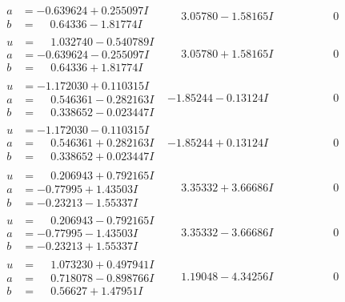 \documentclass[1p]{elsarticle_modified}
\theoremstyle{definition}
\begin{document}
$$\begin{array}{c|c|c}
\begin{aligned}
a &= -0.639624 + 0.255097 I \\
b &= \phantom{-}0.64336 - 1.81774 I\end{aligned}
 & \phantom{-}3.05780 - 1.58165 I & \phantom{-0.000000 } 0 \\ \hline\begin{aligned}
u &= \phantom{-}1.032740 - 0.540789 I \\
a &= -0.639624 - 0.255097 I \\
b &= \phantom{-}0.64336 + 1.81774 I\end{aligned}
 & \phantom{-}3.05780 + 1.58165 I & \phantom{-0.000000 } 0 \\ \hline\begin{aligned}
u &= -1.172030 + 0.110315 I \\
a &= \phantom{-}0.546361 - 0.282163 I \\
b &= \phantom{-}0.338652 - 0.023447 I\end{aligned}
 & -1.85244 - 0.13124 I & \phantom{-0.000000 } 0 \\ \hline\begin{aligned}
u &= -1.172030 - 0.110315 I \\
a &= \phantom{-}0.546361 + 0.282163 I \\
b &= \phantom{-}0.338652 + 0.023447 I\end{aligned}
 & -1.85244 + 0.13124 I & \phantom{-0.000000 } 0 \\ \hline\begin{aligned}
u &= \phantom{-}0.206943 + 0.792165 I \\
a &= -0.77995 + 1.43503 I \\
b &= -0.23213 - 1.55337 I\end{aligned}
 & \phantom{-}3.35332 + 3.66686 I & \phantom{-0.000000 } 0 \\ \hline\begin{aligned}
u &= \phantom{-}0.206943 - 0.792165 I \\
a &= -0.77995 - 1.43503 I \\
b &= -0.23213 + 1.55337 I\end{aligned}
 & \phantom{-}3.35332 - 3.66686 I & \phantom{-0.000000 } 0 \\ \hline\begin{aligned}
u &= \phantom{-}1.073230 + 0.497941 I \\
a &= \phantom{-}0.718078 - 0.898766 I \\
b &= \phantom{-}0.56627 + 1.47951 I\end{aligned}
 & \phantom{-}1.19048 - 4.34256 I & \phantom{-0.000000 } 0 \\ \hline\begin{aligned}

\end{aligned}
\end{array}$$
\end{document}
